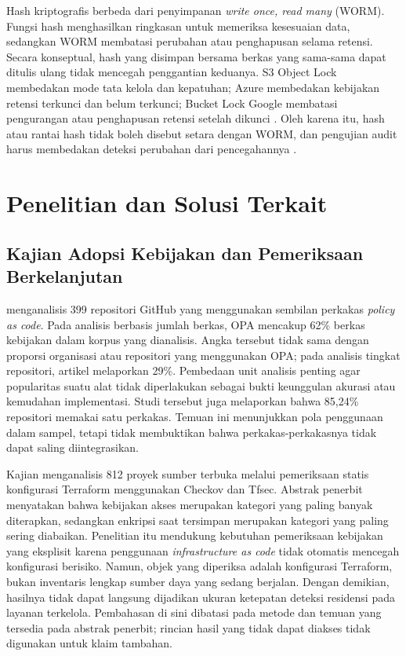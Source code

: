 Hash kriptografis berbeda dari penyimpanan \textit{write once, read many} (WORM). Fungsi hash menghasilkan ringkasan untuk memeriksa kesesuaian data, sedangkan WORM membatasi perubahan atau penghapusan selama retensi. Secara konseptual, hash yang disimpan bersama berkas yang sama-sama dapat ditulis ulang tidak mencegah penggantian keduanya. S3 Object Lock membedakan mode tata kelola dan kepatuhan; Azure membedakan kebijakan retensi terkunci dan belum terkunci; Bucket Lock Google membatasi pengurangan atau penghapusan retensi setelah dikunci \autocite{b2c_awsObjectLock,b2c_azureImmutable,b2c_gcpBucketLock}. Oleh karena itu, hash atau rantai hash tidak boleh disebut setara dengan WORM, dan pengujian audit harus membedakan deteksi perubahan dari pencegahannya \autocite{b2c_pythonHashlib}.

\section{Penelitian dan Solusi Terkait}
\label{sec:penelitian-terkait}
\subsection{Kajian Adopsi Kebijakan dan Pemeriksaan Berkelanjutan}
\textcite{foalem2026} menganalisis 399 repositori GitHub yang menggunakan sembilan perkakas \textit{policy as code}. Pada analisis berbasis jumlah berkas, OPA mencakup 62\% berkas kebijakan dalam korpus yang dianalisis. Angka tersebut tidak sama dengan proporsi organisasi atau repositori yang menggunakan OPA; pada analisis tingkat repositori, artikel melaporkan 29\%. Pembedaan unit analisis penting agar popularitas suatu alat tidak diperlakukan sebagai bukti keunggulan akurasi atau kemudahan implementasi. Studi tersebut juga melaporkan bahwa 85,24\% repositori memakai satu perkakas. Temuan ini menunjukkan pola penggunaan dalam sampel, tetapi tidak membuktikan bahwa perkakas-perkakasnya tidak dapat saling diintegrasikan.

Kajian \textcite{verdet2025} menganalisis 812 proyek sumber terbuka melalui pemeriksaan statis konfigurasi Terraform menggunakan Checkov dan Tfsec. Abstrak penerbit menyatakan bahwa kebijakan akses merupakan kategori yang paling banyak diterapkan, sedangkan enkripsi saat tersimpan merupakan kategori yang paling sering diabaikan. Penelitian itu mendukung kebutuhan pemeriksaan kebijakan yang eksplisit karena penggunaan \textit{infrastructure as code} tidak otomatis mencegah konfigurasi berisiko. Namun, objek yang diperiksa adalah konfigurasi Terraform, bukan inventaris lengkap sumber daya yang sedang berjalan. Dengan demikian, hasilnya tidak dapat langsung dijadikan ukuran ketepatan deteksi residensi pada layanan terkelola. Pembahasan di sini dibatasi pada metode dan temuan yang tersedia pada abstrak penerbit; rincian hasil yang tidak dapat diakses tidak digunakan untuk klaim tambahan.

